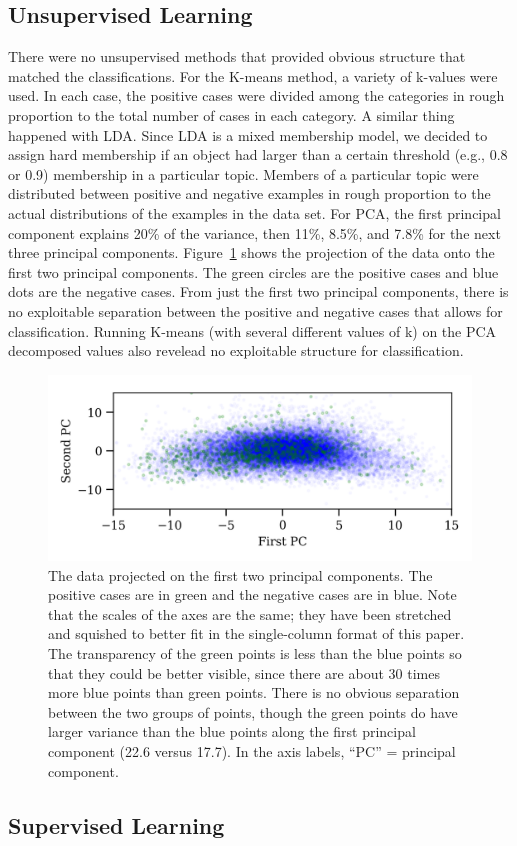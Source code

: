 \subsection{Unsupervised Learning}
There were no unsupervised methods that provided obvious structure  that matched the classifications.  For the K-means method, a variety of k-values were used.  In each case, the positive cases were divided among the categories in rough proportion to the total number of cases in each category.  A similar thing happened with LDA.  Since LDA is a mixed membership model, we decided to assign hard membership if an object had larger than a certain threshold (e.g., 0.8 or 0.9) membership in a particular topic.  Members of a particular topic were distributed between positive and negative examples in rough proportion to the actual distributions of the examples in the data set.
For PCA, the first principal component explains 20\% of the variance, then 11\%, 8.5\%, and 7.8\% for the next three principal components.  Figure~\ref{pca} shows the projection of the data onto the first two principal components.  The green circles are the positive cases and blue dots are the negative cases.  From just the first two principal components, there is no exploitable separation between the positive and negative cases that allows for classification.  Running K-means (with several different values of k) on the PCA decomposed values also revelead no exploitable structure for classification.
\begin{figure}
\begin{centering}
\includegraphics[width=5in]{pca.png}
\caption{\label{pca} The data projected on the first two principal components.  The positive cases are in green and the negative cases are in blue.  Note that the scales of the axes are the same; they have been stretched and squished to better fit in the single-column format of this paper.  The transparency of the green points is less than the blue points so that they could be better visible, since there are about 30 times more blue points than green points.  There is no obvious separation between the two groups of points, though the green points do have larger variance than the blue points along the first principal component (22.6 versus 17.7).  In the axis labels, ``PC'' = principal component.}
\end{centering}
\end{figure}







\subsection{Supervised Learning}